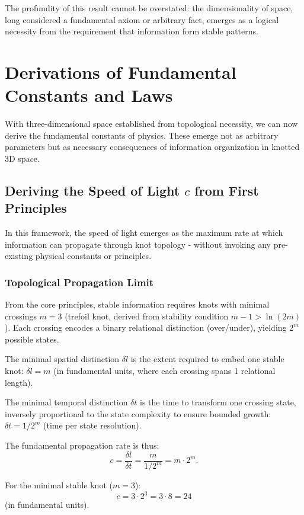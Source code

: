 \documentclass{article}
\begin{document}
The profundity of this result cannot be overstated: the dimensionality of space, long considered a fundamental axiom or arbitrary fact, emerges as a logical necessity from the requirement that information form stable patterns.

\section{Derivations of Fundamental Constants and Laws}
With three-dimensional space established from topological necessity, we can now derive the fundamental constants of physics. These emerge not as arbitrary parameters but as necessary consequences of information organization in knotted 3D space.

\subsection{Deriving the Speed of Light \texorpdfstring{$c$}{c} from First Principles}
In this framework, the speed of light emerges as the maximum rate at which information can propagate through knot topology - without invoking any pre-existing physical constants or principles.

\subsubsection{Topological Propagation Limit}
From the core principles, stable information requires knots with minimal crossings $m = 3$ (trefoil knot, derived from stability condition $m-1 > \ln(2m)$). Each crossing encodes a binary relational distinction (over/under), yielding $2^m$ possible states.

The minimal spatial distinction $\delta l$ is the extent required to embed one stable knot: $\delta l = m$ (in fundamental units, where each crossing spans 1 relational length).

The minimal temporal distinction $\delta t$ is the time to transform one crossing state, inversely proportional to the state complexity to ensure bounded growth: $\delta t = 1 / 2^m$ (time per state resolution).

The fundamental propagation rate is thus:
\[
c = \frac{\delta l}{\delta t} = \frac{m}{1 / 2^m} = m \cdot 2^m.
\]

For the minimal stable knot ($m=3$):
\[
c = 3 \cdot 2^3 = 3 \cdot 8 = 24
\]
(in fundamental units).
\end{document}
